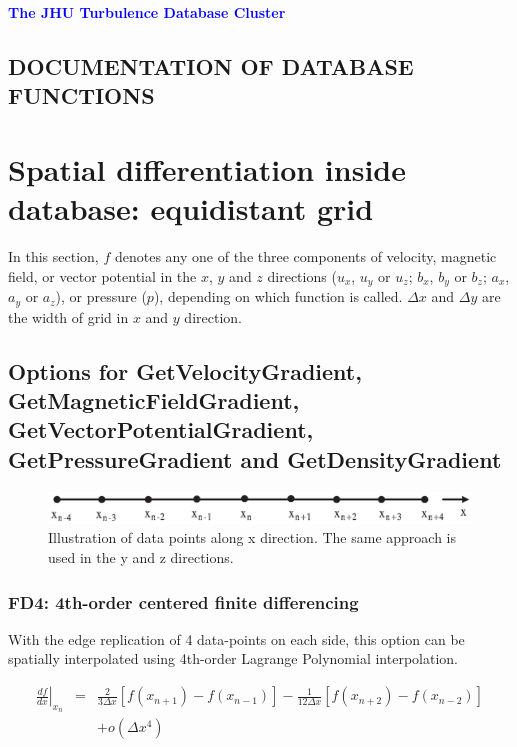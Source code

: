 \documentclass[11pt]{article}
\def\bea{\begin{eqnarray}}
\def\eea{\end{eqnarray}}
\begin{document}
\begin{center}
{\bf \Large \textcolor{blue}{ The JHU Turbulence Database Cluster}}
 \end{center}
 \vskip 1cm
\subsection*{DOCUMENTATION OF DATABASE FUNCTIONS}

\vskip 0.5cm
\section{Spatial differentiation inside database: equidistant grid}

In this section, $f$ denotes any one of the three components of
velocity, magnetic field, or vector potential in the $x$, $y$ and $z$ directions ($u_x$, $u_y$ or $u_z$; $b_x$, $b_y$ or $b_z$; $a_x$, $a_y$ or $a_z$), or pressure ($p$), depending on which function is called. $\Delta x$ and $\Delta y$ are the width of grid in $x$ and $y$ direction.

\subsection{Options for GetVelocityGradient, GetMagneticFieldGradient, GetVectorPotentialGradient, GetPressureGradient and GetDensityGradient}

\begin{figure}[h]
\begin{minipage}{\linewidth}
\centering\includegraphics[width=1.0\linewidth]{1DGrid.eps}
\end{minipage} \caption{Illustration of data points along x direction. The same approach is used in the y and z directions.}\label{1DGrid}
\end{figure}

\subsubsection*{FD4: 4th-order centered finite differencing}
\label{sec-FD4}

With the edge replication of 4 data-points on each side, this option can be spatially interpolated using 4th-order Lagrange Polynomial interpolation.

\bea \left.\frac{df}{dx}\right|_{x_n}
&=& \frac{2}{3\Delta x}[f(x_{n+1})-f(x_{n-1})]-\frac{1}{12\Delta
x}[f(x_{n+2})-f(x_{n-2})]\nonumber\\
&&+o(\Delta x^4) \eea
\end{document}
